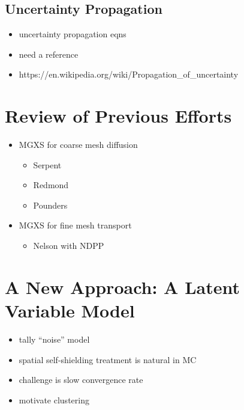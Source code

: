 \subsection{Uncertainty Propagation}
\label{subsec:chap3-uncertainty-prop}

\begin{itemize}[noitemsep]
  \item uncertainty propagation eqns
  \item need a reference
  \item https://en.wikipedia.org/wiki/Propagation_of_uncertainty
\end{itemize}



\section{Review of Previous Efforts}
\label{sec:chap3-lit-review}

\begin{itemize}[noitemsep]
  \item \ac{MGXS} for coarse mesh diffusion
  \begin{itemize}[noitemsep]
    \item Serpent
    \item Redmond
    \item Pounders
  \end{itemize}
  \item \ac{MGXS} for fine mesh transport
  \begin{itemize}[noitemsep]
    \item Nelson with NDPP
  \end{itemize}
\end{itemize}


\section{A New Approach: A Latent Variable Model}
\label{sec:chap3-latent-variables}

\begin{itemize}[noitemsep]
  \item tally ``noise'' model
  \item spatial self-shielding treatment is natural in \ac{MC}
  \item challenge is slow convergence rate
  \item motivate clustering
\end{itemize}